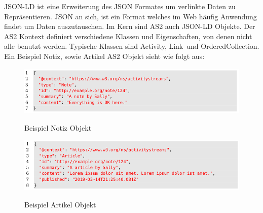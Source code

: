 {	\gls{JSON-LD} ist eine Erweiterung des JSON Formates um verlinkte Daten zu Repräsentieren. JSON an sich, ist ein Format welches im Web häufig Anwendung findet um Daten auszutauschen. Im Kern sind \gls{AS2} auch \gls{JSON-LD} Objekte. Der \gls{AS2} Kontext definiert verschiedene Klassen und Eigenschaften, von denen nicht alle benutzt werden. Typische Klassen sind \glqq Activity\grqq, \glqq Link\grqq~und \glqq OrderedCollection\grqq. Ein Beispiel Notiz, sowie Artikel \gls{AS2} Objekt sieht wie folgt aus:\par
	\begin{figure}[h]
		\begin{minipage}{\textwidth}
			\centering
			\includegraphics[scale=0.5]{figures/object-note.png}
			\label{fig:object-note}
			\caption{Beispiel Notiz Objekt}
		\end{minipage}
	\end{figure}
	\begin{figure}[h]
		\begin{minipage}{\textwidth}
			\centering
			\includegraphics[scale=0.5]{figures/object-article.png}
			\label{fig:object-article}
			\caption{Beispiel Artikel Objekt}
		\end{minipage}
	\end{figure}
}

